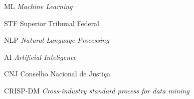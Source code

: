 \begin{siglas}
  \item[ML] \textit{Machine Learning}
  \item[STF] Superior Tribunal Federal
  \item[NLP] \textit{Natural Language Processing}
  \item[AI] \textit{Artificial Inteligence}
  \item[CNJ] Conselho Nacional de Justiça
  \item{CRISP-DM} \textit{Cross-industry standard process for data mining}
\end{siglas}
